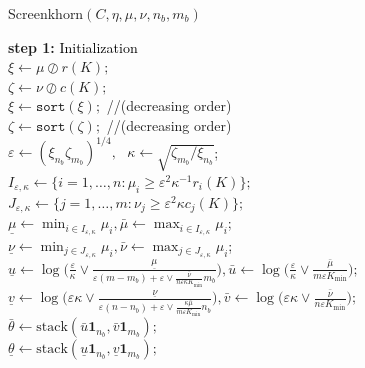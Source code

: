 \LinesNotNumbered
\begin{algorithm}[htbp]
\DontPrintSemicolon
\caption{Screenkhorn$(C,\eta,\mu,\nu,n_b,m_b)$}
\label{screenkhorn}

\textbf{step 1:} \textcolor{black}{Initialization}\\

\nl   $\xi \gets \mu \oslash r(K);$ \\
\nl   $\zeta \gets \nu \oslash c(K);$\\
\nl   $\xi \gets \texttt{sort}(\xi);$ //(decreasing order)\\
\nl   $\zeta \gets \texttt{sort}(\zeta);$ //(decreasing order)\\
\nl   $\varepsilon \gets (\xi_{n_b}\zeta_{m_b})^{1/4}, \text{  } \kappa \gets \sqrt{{\zeta_{m_b}}/{\xi_{n_b}}}$;\\
\nl   $I_{\varepsilon,\kappa} \gets \{i=1, \ldots, n: \mu_i \geq {\varepsilon^2} \kappa^{-1} r_i(K)\};$\\
\nl   $J_{\varepsilon,\kappa} \gets \{j=1, \ldots, m: \nu_j \geq \varepsilon^2\kappa c_j(K)\};$\\ 


\nl   $\underline{\mu} \gets \min_{i \in I_{\varepsilon,\kappa}} \mu_i, \bar{\mu} \gets \max_{i \in I_{\varepsilon,\kappa}} \mu_i$; \\
\nl   $\underline{\nu} \gets \min_{j \in J_{\varepsilon,\kappa}} \mu_i, \bar{\nu} \gets \max_{j \in J_{\varepsilon,\kappa}} \mu_i$; \\
\nl   $\underline{u} \gets \log\big(\frac \varepsilon\kappa \vee \frac{\underline{\mu}}{\varepsilon (m-m_b) + \varepsilon \vee \frac{\bar{\nu}}{n\varepsilon\kappa K_{\min}} m_b}\big), \bar{u} \gets  \log\big(\frac \varepsilon\kappa\vee \frac{\bar{\mu}}{m\varepsilon K_{\min}}\big);$\\
\nl   $\underline{v} \gets \log\big(\varepsilon\kappa \vee \frac{\underline{\nu}}{\varepsilon(n-n_b) + \varepsilon \vee \frac{\kappa\bar{\mu}}{m\varepsilon K_{\min}} n_b}\big), \bar{v} \gets \log\big(\varepsilon\kappa \vee \frac{\bar{\nu}}{n\varepsilon K_{\min}}\big);$\\
\nl   $ \bar{\theta} \gets \text{stack}(\bar{u}\mathbf 1_{n_b}, \bar{v}\mathbf 1_{m_b});$\\
\nl   $ \underline{\theta} \gets \text{stack}(\underline{u}\mathbf 1_{n_b}, \underline{v}\mathbf 1_{m_b}) ;$\\ %


\end{algorithm}
